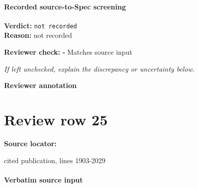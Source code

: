 \documentclass[10pt]{article}
\newcommand{\reviewerbox}{%
  \par\noindent\fbox{\parbox{0.96\linewidth}{\rule{0pt}{0.38in}}}\par
}
\newcommand{\reviewmatch}[1]{%
  \par\noindent\textbf{Reviewer check:} $\square$\; #1\par
  \noindent\emph{If left unchecked, explain the discrepancy or uncertainty below.}\par
}
\begin{document}
\paragraph{Recorded source-to-Spec screening}
\textbf{Verdict:} \texttt{not recorded}
\\
\textbf{Reason:} not recorded
\reviewmatch{Matches source input}
\noindent\textbf{Reviewer annotation}\par
\reviewerbox
\clearpage
\hypertarget{source-claim-c141e929e91e7be9}{}
\section*{Review row 25}
\textbf{Source locator:} {\footnotesize\raggedright cited publication, lines 1903-\allowbreak{}2029\par}
\paragraph{Verbatim source input}
\end{document}
